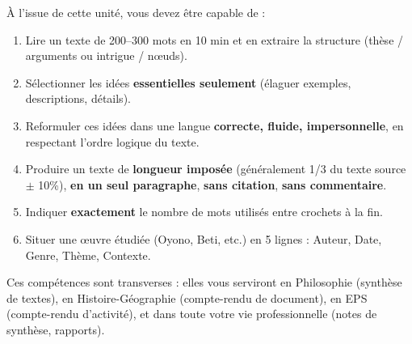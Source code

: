 \documentclass[11pt]{article}
\begin{document}
\begin{propriete}
À l'issue de cette unité, vous devez être capable de :
\begin{enumerate}
    \item Lire un texte de 200--300 mots en 10 min et en extraire la structure (thèse / arguments ou intrigue / nœuds).
    \item Sélectionner les idées \textbf{essentielles seulement} (élaguer exemples, descriptions, détails).
    \item Reformuler ces idées dans une langue \textbf{correcte, fluide, impersonnelle}, en respectant l'ordre logique du texte.
    \item Produire un texte de \textbf{longueur imposée} (généralement 1/3 du texte source $\pm$ 10\%), \textbf{en un seul paragraphe}, \textbf{sans citation}, \textbf{sans commentaire}.
    \item Indiquer \textbf{exactement} le nombre de mots utilisés entre crochets à la fin.
    \item Situer une œuvre étudiée (Oyono, Beti, etc.) en 5 lignes : Auteur, Date, Genre, Thème, Contexte.
\end{enumerate}
Ces compétences sont transverses : elles vous serviront en Philosophie (synthèse de textes), en Histoire-Géographie (compte-rendu de document), en EPS (compte-rendu d'activité), et dans toute votre vie professionnelle (notes de synthèse, rapports).
\end{propriete}
\end{document}
